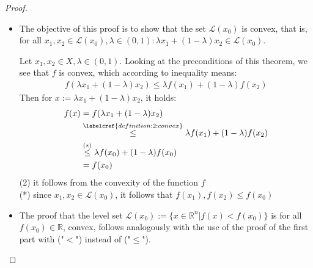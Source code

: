 \documentclass[a4paper, 11pt]{report}
\theoremstyle{break}
\theoremstyle{proofstyle}
\newtheorem{proof}{Proof}
\newcommand{\R}{\mathbb{R}}
\begin{document}
\begin{proof}
	\begin{itemize}
		\item The objective of this proof is to show that the set $\mathcal{L}(x_0)$ is convex, that is, for all $x_1, x_2 \in \mathcal{L}(x_0), \lambda\in (0,1) : \lambda x_1 + (1-\lambda) x_2 \in\mathcal{L}(x_0)$.
		
		Let $x_1, x_2 \in X, \lambda\in (0,1)$. Looking at the preconditions of this theorem, we see that $f$ is convex, which according to inequality  means:  %
		\begin{align*}
		    f ( \lambda x_1 + (1-\lambda) x_2 ) \leq \lambda f(x_1) + (1-\lambda)f(x_2)
		\end{align*}
		Then for $x := \lambda x_1 + (1-\lambda) x_2$, it holds:
		\begin{align*}
		    f(x) &= f(\lambda x_1 + (1-\lambda) x_2) \\
		         &\overset{\labelcref{definition:2:convex}}{\leq} \lambda f(x_1) + (1-\lambda)f(x_2)\\
		         &\overset{(*)}{\leq} \lambda f(x_0) + (1-\lambda) f(x_0)\\
		         &= f(x_0)
		\end{align*}
		(2) it follows from the convexity of the function $f$ \\ 
		(*) since $x_1, x_2 \in \mathcal{L}(x_0)$, it follows that $f(x_1), f(x_2) \leq f(x_0)$
		\item The proof that the level set $\mathcal{L}(x_0) := \{ x \in \R^n | f(x) < f(x_0) \}$ is for all $f(x_0) \in \R$, convex, follows analogously with the use of the proof of the first part with ("$<$") instead of ("$\leq$"). 
	\end{itemize}
\end{proof}
\end{document}
